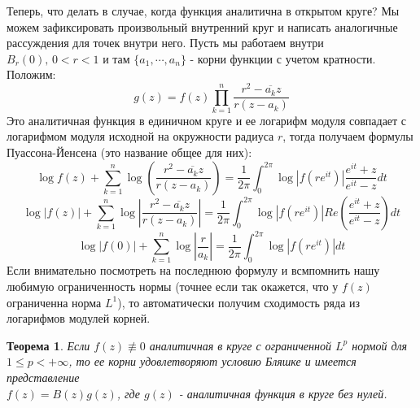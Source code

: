 \documentclass[12pt,a4paper]{article} %
\newtheorem{theorem}{Теорема}
\begin{document}
	Теперь, что делать в случае, когда функция аналитична в открытом круге? Мы можем зафиксировать произвольный внутренний круг и написать аналогичные рассуждения для точек внутри него. Пусть мы работаем внутри $B_r(0),\,0<r<1$ и там $\{a_1,\cdots,a_n\}$ - корни функции с учетом кратности. Положим:
	$$g(z)=f(z)\prod_{k=1}^n\frac{r^2-\overline{a_k}z}{r(z-a_k)}$$
	Это аналитичная функция в единичном круге и ее логарифм модуля совпадает с логарифмом модуля исходной на окружности радиуса $r$, тогда получаем формулы Пуассона-Йенсена (это название общее для них):
	$$\log f(z)+\sum_{k=1}^n\log\left(\frac{r^2-\overline{a_k}z}{r(z-a_k)}\right)=\frac{1}{2\pi}\int_0^{2\pi}\log|f(re^{it})|\frac{e^{it}+z}{e^{it}-z}dt$$
	$$\log |f(z)|+\sum_{k=1}^n\log\left|\frac{r^2-\overline{a_k}z}{r(z-a_k)}\right|=\frac{1}{2\pi}\int_0^{2\pi}\log|f(re^{it})|Re\left(\frac{e^{it}+z}{e^{it}-z}\right)dt$$
	$$\log |f(0)|+\sum_{k=1}^n\log\left|\frac{r}{a_k}\right|=\frac{1}{2\pi}\int_0^{2\pi}\log|f(re^{it})|dt$$
	Если внимательно посмотреть на последнюю формулу и всмпомнить нашу любимую ограниченность нормы (точнее если так окажется, что у $f(z)$ ограниченна норма $L^1$), то автоматически получим сходимость ряда из логарифмов модулей корней.
	\begin{theorem}\label{выделение_корней_в_круге}
		Если $f(z)\not\equiv0$ аналитичная в круге с ограниченной $L^p$ нормой для $1\leq p<+\infty$, то ее корни удовлетворяют условию Бляшке и имеется представление \\$f(z)=B(z)g(z)$, где $g(z)$ - аналитичная функция в круге без нулей.
	\end{theorem}
\end{document}
